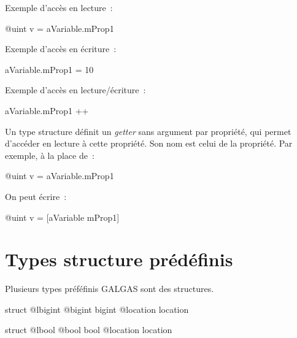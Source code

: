 Exemple d'accès en lecture~:
\begin{galgas3}
@uint v = aVariable.mProp1
\end{galgas3}

Exemple d'accès en écriture~:
\begin{galgas3}
aVariable.mProp1 = 10
\end{galgas3}


Exemple d'accès en lecture/écriture~:
\begin{galgas3}
aVariable.mProp1 ++
\end{galgas3}






Un type structure définit un \emph{getter} sans argument par propriété, qui permet d'accéder en lecture à cette propriété. Son nom est celui de la propriété. Par exemple, à la place de~:
\begin{galgas3}
@uint v = aVariable.mProp1
\end{galgas3}

On peut écrire~:
\begin{galgas3}
@uint v = [aVariable mProp1]
\end{galgas3}








\section{Types structure prédéfinis}

Plusieurs types préféfinis GALGAS sont des structures.


\begin{galgas3}
struct @lbigint {
  @bigint bigint
  @location location
}
\end{galgas3}




\begin{galgas3}
struct @lbool {
  @bool bool
  @location location
}
\end{galgas3}




